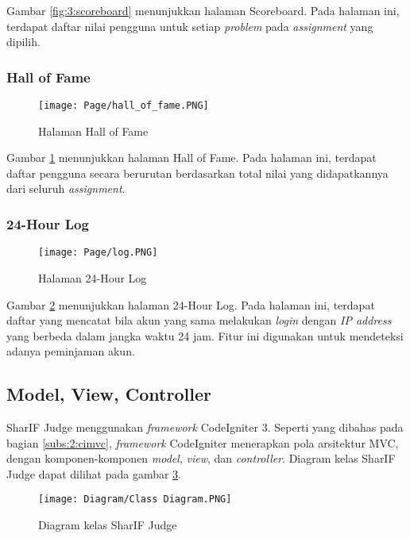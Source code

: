     Gambar \ref{fig:3:scoreboard} menunjukkan halaman Scoreboard. Pada halaman ini, terdapat daftar nilai pengguna untuk setiap \textit{problem} pada \textit{assignment} yang dipilih.
    
\subsubsection{Hall of Fame}
    \begin{figure}[H]
    	\centering  
    	\texttt{[image: Page/hall\_of\_fame.PNG]}  
    	\caption{Halaman Hall of Fame}
    	\label{fig:3:hall_of_fame} 
    \end{figure} 
    
    Gambar \ref{fig:3:hall_of_fame} menunjukkan halaman Hall of Fame. Pada halaman ini, terdapat daftar pengguna secara berurutan berdasarkan total nilai yang didapatkannya dari seluruh \textit{assignment}.

\subsubsection{24-Hour Log}
    \begin{figure}[H]
    	\centering  
    	\texttt{[image: Page/log.PNG]}  
    	\caption{Halaman 24-Hour Log}
    	\label{fig:3:log} 
    \end{figure} 
    
    Gambar \ref{fig:3:log} menunjukkan halaman 24-Hour Log. Pada halaman ini, terdapat daftar yang mencatat bila akun yang sama melakukan \textit{login} dengan \textit{IP address} yang berbeda dalam jangka waktu 24 jam. Fitur ini digunakan untuk mendeteksi adanya peminjaman akun.

\subsection{Model, View, Controller}
\label{subs:3:mvc}
SharIF Judge menggunakan \textit{framework} CodeIgniter 3. Seperti yang dibahas pada bagian \ref{subs:2:cimvc}, \textit{framework} CodeIgniter menerapkan pola arsitektur MVC, dengan komponen-komponen \textit{model}, \textit{view}, dan \textit{controller}. Diagram kelas SharIF Judge dapat dilihat pada gambar \ref{fig:3:classdiagram}.

    \begin{figure}[H]
    	\centering  
    	\texttt{[image: Diagram/Class Diagram.PNG]}  
    	\caption{Diagram kelas SharIF Judge}
    	\label{fig:3:classdiagram} 
    \end{figure} 


